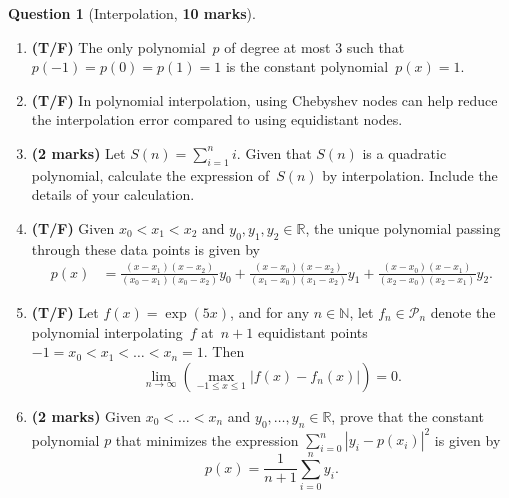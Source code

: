 \documentclass[10pt]{article}
\theoremstyle{definition}
\newtheorem{question}{Question}
\theoremstyle{remark}
\theoremstyle{plain}%
\begin{document}
\newpage
\begin{question}
    [Interpolation, \textbf{10 marks}]
    $~$
    \begin{enumerate}
        \item
            \textbf{(T/F)}
            The only polynomial~$p$ of degree at most 3 such that $p(-1) = p(0) = p(1) = 1$ is the
            constant polynomial~$p(x) = 1$.

        \item
            \textbf{(T/F)}
            In polynomial interpolation, using Chebyshev nodes can help reduce the interpolation error compared to using equidistant nodes.

        \item
            \textbf{(2 marks)}
            Let $S(n) = \sum_{i=1}^{n} i$.
            Given that $S(n)$ is a quadratic polynomial,
            calculate the expression of~$S(n)$ by interpolation.
            Include the details of your calculation.
            \vspace{2.5cm}

        \item
            \textbf{(T/F)}
            Given $x_0 < x_1 < x_2$
            and $y_0, y_1, y_2 \in \mathbb R$,
            the unique polynomial passing through these data points is given by
            \begin{align*}
                p(x) &=
                \frac{(x - x_1) (x-x_2)}{(x_0 - x_1) (x_0 - x_2)} y_0
                + \frac{(x - x_0) (x-x_2) }{(x_1 - x_0) (x_1 - x_2)} y_1
                + \frac{(x - x_0) (x-x_1)}{(x_2 - x_0) (x_2 - x_1)} y_2.
            \end{align*}

        \item
            \textbf{(T/F)}
            Let $f(x) = \exp(5x)$,
            and for any $n \in \mathbb N$,
            let $f_n \in \mathcal P_n$ denote the polynomial interpolating~$f$ at~$n+1$ equidistant points $-1 = x_0 < x_1 < \dotsc < x_n = 1$.
            Then
            \[
                \lim_{n \to \infty} \left( \max_{-1 \leqslant x \leqslant 1} \bigl\lvert f(x) - f_n(x) \bigr\rvert \right) = 0.
            \]

        \item
            \textbf{(2 marks)}
            Given $x_0 < \dotsc < x_n$
            and $y_0, \dotsc, y_n \in \mathbb R$,
            prove that the constant polynomial $p$ that minimizes 
            the expression $\sum_{i=0}^{n} |y_i - p(x_i)|^2$ is given by
            \[
                p(x) = \frac{1}{n+1} \sum_{i=0}^{n} y_i.
            \]
            \vspace{1.0cm}


\end{enumerate}
\end{question}
\end{document}
